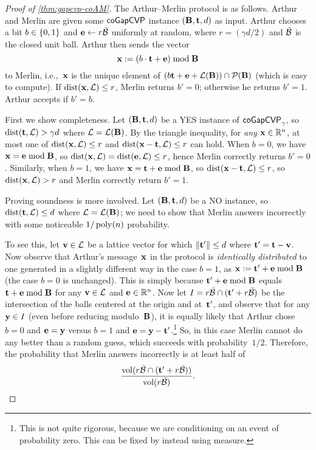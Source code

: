\documentclass[11pt]{article}
\begin{document}
\begin{proof}[Proof of \cref{thm:gapcvp-coAM}]
  The Arthur--Merlin protocol is as follows. Arthur and Merlin are
  given some $\cogapcvp$ instance $(\matB, \vect, d)$ as input. Arthur
  chooses a bit $b \in \bit$ and $\vece \leftarrow r \bar{\cal{B}}$
  uniformly at random, where $r = (\gamma d/2)$ and $\bar{\cal{B}}$ is
  the closed unit ball. Arthur then sends the vector
  \[ \vecx := (b\cdot \vect + \vece) \bmod \matB \] to Merlin,
  i.e.,~$\vecx$ is the unique element of
  $(b \vect + \vece + \lat(\matB)) \cap \piped(\matB)$ (which is easy
  to compute). If $\dist(\vecx, \lat) \leq r$, Merlin returns
  $b' = 0$; otherwise he returns $b'=1$. Arthur accepts if $b' = b$.

  First we show completeness. Let $(\matB, \vect, d)$ be a YES
  instance of $\cogapcvp_{\gamma}$, so $\dist(\vect, \lat) > \gamma d$
  where $\lat=\lat(\matB)$. By the triangle inequality, for \emph{any}
  $\vecx \in \R^{n}$, at most one of $\dist(\vecx, \lat) \leq r$ and
  $\dist(\vecx - \vect, \lat) \leq r$ can hold. When $b=0$, we have
  $\vecx = \vece \bmod \matB$, so
  $\dist(\vecx,\lat) = \dist(\vece,\lat) \leq r$, hence Merlin
  correctly returns $b'=0$. Similarly, when $b=1$, we have
  $\vecx = \vect + \vece \bmod \matB$, so
  $\dist(\vecx - \vect, \lat) \leq r$, so $\dist(\vecx,\lat) > r$ and
  Merlin correctly return $b'=1$.

  Proving soundness is more involved. Let $(\matB, \vect, d)$ be a NO
  instance, so $\dist(\vect,\lat) \leq d$ where $\lat=\lat(\matB)$; we
  need to show that Merlin answers incorrectly with some noticeable
  $1/\poly(n)$ probability.

  To see this, let $\vecv \in \lat$ be a lattice vector for which
  $\length{\vect'} \leq d$ where $\vect' = \vect - \vecv$. Now observe
  that Arthur's message~$\vecx$ in the protocol is \emph{identically
    distributed} to one generated in a slightly different way in the
  case $b=1$, as $\vecx := \vect' + \vece \bmod \matB$ (the case $b=0$
  is unchanged). This is simply because $\vect' + \vece \bmod \matB$
  equals $\vect + \vece \bmod \matB$ for any $\vecv \in \lat$ and
  $\vece \in \R^{n}$. Now let
  $I = r \bar{\cal{B}} \cap (\vect' + r \bar{\cal{B}})$ be the
  intersection of the balls centered at the origin and at~$\vect'$,
  and observe that for any $\vecy \in I$ (even before reducing
  modulo~$\matB$), it is equally likely that Arthur chose $b=0$ and
  $\vece=\vecy$ versus $b=1$ and $\vece=\vecy-\vect'$.\footnote{This
    is not quite rigorous, because we are conditioning on an event of
    probability zero. This can be fixed by instead using measure.} So,
  in this case Merlin cannot do any better than a random guess, which
  succeeds with probability~$1/2$. Therefore, the probability that
  Merlin answers incorrectly is at least half of
  \begin{equation}
    \label{eq:ratio-ball-intersection}
    \frac{\vol(r \bar{\cal{B}} \cap (\vect' + r
      \bar{\cal{B}}))}{\vol(r \bar{\cal{B}})} .
  \end{equation}


\end{proof}
\end{document}
